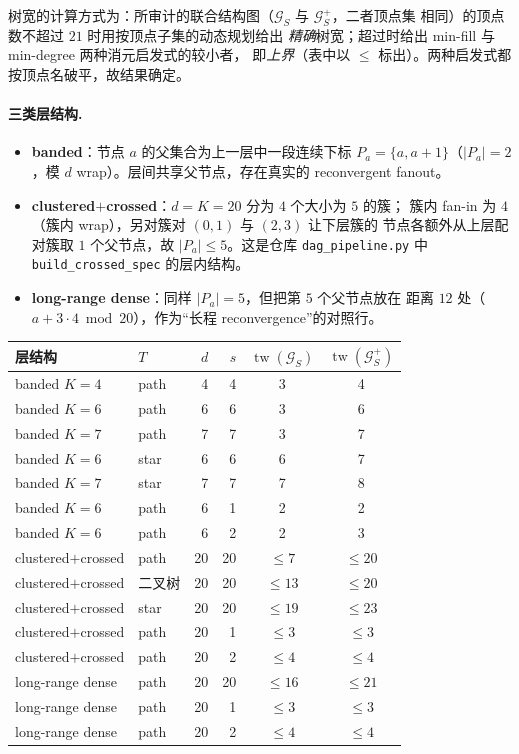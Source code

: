 \documentclass[a4paper,11pt]{article}
\theoremstyle{definition}
\newcommand{\1}{\mathbf 1}
\newcommand{\tw}{\operatorname{tw}}
\newcommand{\Gcal}{\mathcal G}
\begin{document}
树宽的计算方式为：所审计的联合结构图（$\Gcal_S$ 与 $\Gcal_S^{+}$，二者顶点集
相同）的顶点数不超过 $21$ 时用按顶点子集的动态规划给出
\emph{精确}树宽；超过时给出 min-fill 与 min-degree 两种消元启发式的较小者，
即\emph{上界}（表中以 $\le$ 标出）。两种启发式都按顶点名破平，故结果确定。

\paragraph{三类层结构.}
\begin{itemize}
\item \textbf{banded}：节点 $a$ 的父集合为上一层中一段连续下标
$P_a=\{a,a+1\}$（$|P_a|=2$，模 $d$ wrap）。层间共享父节点，存在真实的
reconvergent fanout。
\item \textbf{clustered$+$crossed}：$d=K=20$ 分为 $4$ 个大小为 $5$ 的簇；
簇内 fan-in 为 $4$（簇内 wrap），另对簇对 $(0,1)$ 与 $(2,3)$ 让下层簇的
节点各额外从上层配对簇取 $1$ 个父节点，故 $|P_a|\le5$。这是仓库
\texttt{dag\_pipeline.py} 中 \texttt{build\_crossed\_spec} 的层内结构。
\item \textbf{long-range dense}：同样 $|P_a|=5$，但把第 $5$ 个父节点放在
距离 $12$ 处（$a+3\cdot4 \bmod 20$），作为“长程 reconvergence”的对照行。
\end{itemize}

\begin{center}
\small
\begin{tabular}{llrrcc}
\toprule
层结构 & $T$ & $d$ & $s$ & $\tw(\Gcal_S)$ & $\tw(\Gcal_S^{+})$\\
\midrule
banded $K=4$   & path & 4 & 4 & 3 & 4\\
banded $K=6$   & path & 6 & 6 & 3 & 6\\
banded $K=7$   & path & 7 & 7 & 3 & 7\\
banded $K=6$   & star & 6 & 6 & 6 & 7\\
banded $K=7$   & star & 7 & 7 & 7 & 8\\
\midrule
banded $K=6$   & path & 6 & 1 & 2 & 2\\
banded $K=6$   & path & 6 & 2 & 2 & 3\\
\midrule
clustered$+$crossed & path   & 20 & 20 & $\le7$  & $\le20$\\
clustered$+$crossed & 二叉树 & 20 & 20 & $\le13$ & $\le20$\\
clustered$+$crossed & star   & 20 & 20 & $\le19$ & $\le23$\\
clustered$+$crossed & path   & 20 & 1  & $\le3$  & $\le3$\\
clustered$+$crossed & path   & 20 & 2  & $\le4$  & $\le4$\\
\midrule
long-range dense & path & 20 & 20 & $\le16$ & $\le21$\\
long-range dense & path & 20 & 1  & $\le3$  & $\le3$\\
long-range dense & path & 20 & 2  & $\le4$  & $\le4$\\
\bottomrule
\end{tabular}
\end{center}
\end{document}
